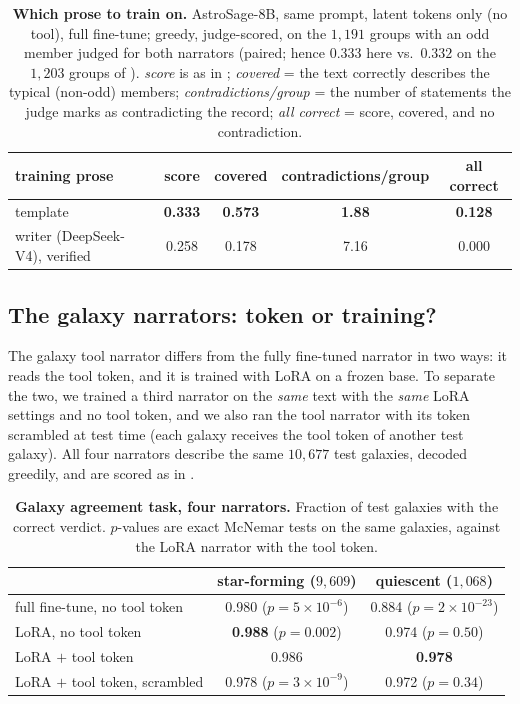\begin{table}[h]\centering\small
\caption{\textbf{Which prose to train on.} AstroSage-8B, same prompt, latent
tokens only (no tool), full fine-tune; greedy, judge-scored, on the $1{,}191$
groups with an odd member judged for both narrators (paired; hence $0.333$ here
vs.\ $0.332$ on the $1{,}203$ groups of ). \emph{score} is as
in ; \emph{covered} = the text correctly describes the typical
(non-odd) members; \emph{contradictions/group} = the number of statements the
judge marks as contradicting the record; \emph{all correct} = score, covered,
and no contradiction.}
\label{tab:corpus}
\begin{tabular}{lcccc}
\toprule
training prose & score & covered & contradictions/group & all correct \\
\midrule
template       & \textbf{0.333} & \textbf{0.573} & \textbf{1.88} & \textbf{0.128} \\
writer (DeepSeek-V4), verified & 0.258 & 0.178 & 7.16 & 0.000 \\
\bottomrule
\end{tabular}
\end{table}


\subsection{The galaxy narrators: token or training?}\label{app:2x2}
The galaxy tool narrator differs from the fully fine-tuned narrator in two ways:
it reads the tool token, and it is trained with LoRA on a frozen base. To separate
the two, we trained a third narrator on the \emph{same} text with the \emph{same}
LoRA settings and no tool token, and we also ran the tool narrator with its token
scrambled at test time (each galaxy receives the tool token of another test
galaxy). All four narrators describe the same $10{,}677$ test galaxies, decoded
greedily, and are scored as in .

\begin{table}[h]\centering\small
\caption{\textbf{Galaxy agreement task, four narrators.} Fraction of test
galaxies with the correct verdict. $p$-values are exact McNemar tests on the same
galaxies, against the LoRA narrator with the tool token.}
\label{tab:2x2}
\begin{tabular}{lcc}
\toprule
 & star-forming ($9{,}609$) & quiescent ($1{,}068$) \\
\midrule
full fine-tune, no tool token          & 0.980 ($p{=}5{\times}10^{-6}$) & 0.884 ($p{=}2{\times}10^{-23}$) \\
LoRA, no tool token                    & \textbf{0.988} ($p{=}0.002$) & 0.974 ($p{=}0.50$) \\
LoRA $+$ tool token                    & 0.986 & \textbf{0.978} \\
LoRA $+$ tool token, scrambled         & 0.978 ($p{=}3{\times}10^{-9}$) & 0.972 ($p{=}0.34$) \\
\bottomrule
\end{tabular}
\end{table}

